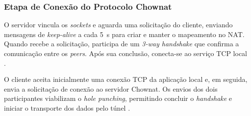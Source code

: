 \subsubsection{Etapa de Conexão do Protocolo Chownat}
\label{sec:chownat_connection}

O servidor vincula os \textit{sockets} e aguarda uma solicitação do cliente, enviando mensagens de \textit{keep-alive} a cada 5~s para criar e manter o mapeamento no NAT. Quando recebe a solicitação, participa de um \textit{3-way handshake} que confirma a comunicação entre os \textit{peers}. Após sua conclusão, conecta-se ao serviço TCP local \citep{kamkar2004chownatv07}.

O cliente aceita inicialmente uma conexão TCP da aplicação local e, em seguida, envia a solicitação de conexão ao servidor Chownat. Os envios dos dois participantes viabilizam o \textit{hole punching}, permitindo concluir o \textit{handshake} e iniciar o transporte dos dados pelo túnel \citep{kamkar2004chownatv07}.
